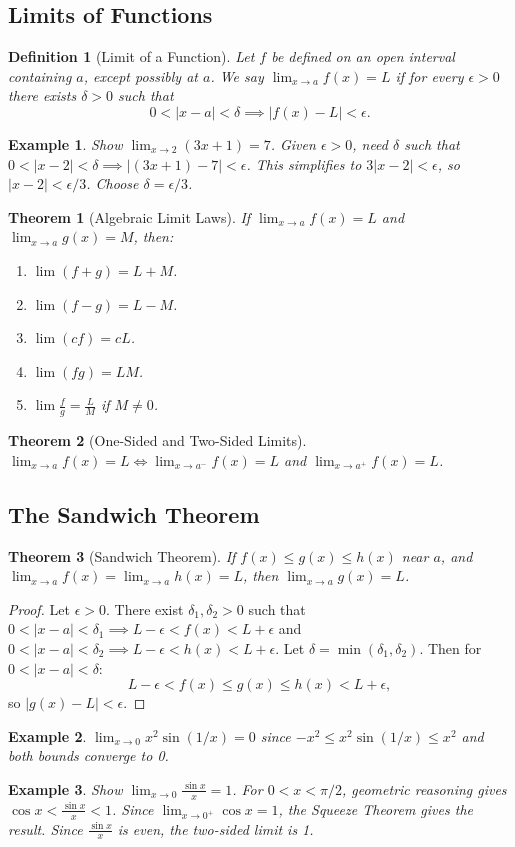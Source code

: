 \documentclass[11pt,a4paper]{article}
\newtheorem{example}{Example}
\newtheorem{theorem}{Theorem}
\newtheorem{definition}{Definition}
\begin{document}
\subsection{Limits of Functions}
\begin{definition}[Limit of a Function]
Let $f$ be defined on an open interval containing $a$, except possibly at $a$. We say $\lim_{x \to a} f(x) = L$ if for every $\epsilon > 0$ there exists $\delta > 0$ such that
\[
0 < |x - a| < \delta \implies |f(x) - L| < \epsilon.
\]
\end{definition}
\begin{example}
Show $\lim_{x \to 2} (3x + 1) = 7$.
Given $\epsilon > 0$, need $\delta$ such that $0 < |x-2| < \delta \implies |(3x+1) - 7| < \epsilon$. This simplifies to $3|x-2| < \epsilon$, so $|x-2| < \epsilon/3$. Choose $\delta = \epsilon/3$.
\end{example}
\begin{theorem}[Algebraic Limit Laws]
If $\lim_{x \to a} f(x) = L$ and $\lim_{x \to a} g(x) = M$, then:
\begin{enumerate}
\item $\lim (f+g) = L+M$.
\item $\lim (f-g) = L-M$.
\item $\lim (cf) = cL$.
\item $\lim (fg) = LM$.
\item $\lim \frac{f}{g} = \frac{L}{M}$ if $M \neq 0$.
\end{enumerate}
\end{theorem}
\begin{theorem}[One-Sided and Two-Sided Limits]
$\lim_{x \to a} f(x) = L \iff \lim_{x \to a^-} f(x) = L$ and $\lim_{x \to a^+} f(x) = L$.
\end{theorem}
\subsection{The Sandwich Theorem}
\begin{theorem}[Sandwich Theorem]
If $f(x) \leq g(x) \leq h(x)$ near $a$, and $\lim_{x \to a} f(x) = \lim_{x \to a} h(x) = L$, then $\lim_{x \to a} g(x) = L$.
\end{theorem}
\begin{proof}
Let $\epsilon > 0$. There exist $\delta_1, \delta_2 > 0$ such that $0 < |x-a| < \delta_1 \implies L - \epsilon < f(x) < L + \epsilon$ and $0 < |x-a| < \delta_2 \implies L - \epsilon < h(x) < L + \epsilon$. Let $\delta = \min(\delta_1, \delta_2)$. Then for $0 < |x-a| < \delta$:
\[
L - \epsilon < f(x) \leq g(x) \leq h(x) < L + \epsilon,
\]
so $|g(x) - L| < \epsilon$.
\end{proof}
\begin{example}
$\lim_{x \to 0} x^2 \sin(1/x) = 0$ since $-x^2 \leq x^2 \sin(1/x) \leq x^2$ and both bounds converge to 0.
\end{example}
\begin{example}
Show $\lim_{x \to 0} \frac{\sin x}{x} = 1$.
For $0 < x < \pi/2$, geometric reasoning gives $\cos x < \frac{\sin x}{x} < 1$. Since $\lim_{x \to 0^+} \cos x = 1$, the Squeeze Theorem gives the result. Since $\frac{\sin x}{x}$ is even, the two-sided limit is 1.
\end{example}
\end{document}
